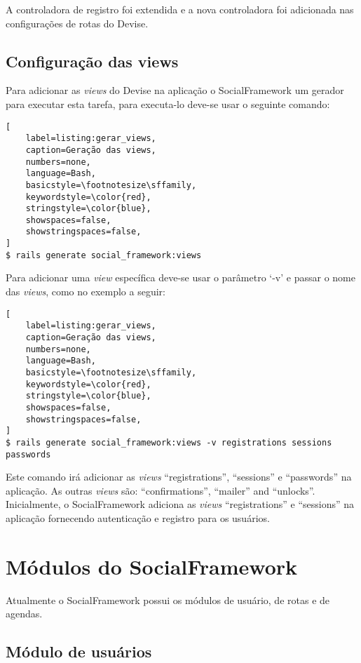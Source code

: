 A controladora de registro foi extendida e a nova controladora foi adicionada nas configurações de rotas do Devise.

\subsection{Configuração das views}

Para adicionar as \textit{views} do Devise na aplicação o SocialFramework um gerador para executar esta tarefa, para executa-lo deve-se usar o seguinte comando:

\begin{lstlisting}[
    label=listing:gerar_views,
    caption=Geração das views,
    numbers=none,
    language=Bash,
    basicstyle=\footnotesize\sffamily,
    keywordstyle=\color{red},
    stringstyle=\color{blue},
    showspaces=false,
    showstringspaces=false,
]
$ rails generate social_framework:views
\end{lstlisting}

Para adicionar uma \textit{view} específica deve-se usar o parâmetro `-v' e passar o nome das \textit{views}, como no exemplo a seguir:

\begin{lstlisting}[
    label=listing:gerar_views,
    caption=Geração das views,
    numbers=none,
    language=Bash,
    basicstyle=\footnotesize\sffamily,
    keywordstyle=\color{red},
    stringstyle=\color{blue},
    showspaces=false,
    showstringspaces=false,
]
$ rails generate social_framework:views -v registrations sessions passwords
\end{lstlisting}

Este comando irá adicionar as \textit{views} ``registrations'', ``sessions'' e ``passwords'' na aplicação. As outras \textit{views} são: ``confirmations'', ``mailer'' and ``unlocks''. Inicialmente, o SocialFramework adiciona as \textit{views} ``registrations'' e ``sessions'' na aplicação fornecendo autenticação e registro para os usuários.

\section{Módulos do SocialFramework}

Atualmente o SocialFramework possui os módulos de usuário, de rotas e de agendas.

\subsection{Módulo de usuários}

